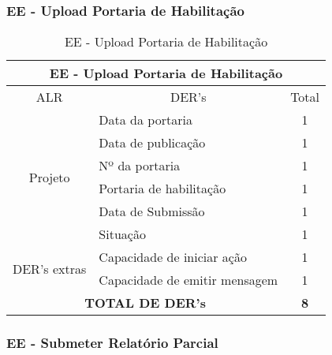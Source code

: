 \vfill
\pagebreak
  \subsubsection{EE - Upload Portaria de Habilitação}
\begin{table}[!h]
\centering
\caption{EE - Upload Portaria de Habilitação}
\label{ee_upload_portaria_de_habilitacao}
\begin{tabular}{|c|l|c|}
\hline
\multicolumn{3}{|c|}{EE - Upload Portaria de Habilitação}                    \\ \hline
ALR                      & \multicolumn{1}{c|}{DER's} & Total \\ \hline
\multirow{6}{*}{Projeto} & Data da portaria                         & 1     \\ \cline{2-3} 
                         & Data de publicação            & 1     \\ \cline{2-3} 
                         & Nº da portaria      & 1     \\ \cline{2-3} 
                         & Portaria de habilitação              & 1     \\ \cline{2-3}
			 & Data de Submissão        & 1     \\ \cline{2-3} 
                         & Situação & 1     \\ \hline
\multirow{2}{*}{DER's extras}             & Capacidade de iniciar ação & 1      \\ \cline{2-3} 
			 & Capacidade de emitir mensagem & 1\\ \hline
\multicolumn{2}{|c|}{\textbf{TOTAL DE DER's}}                  & \textbf{8}     \\ \hline
\end{tabular}
\end{table}


  \subsubsection{EE - Submeter Relatório Parcial}

